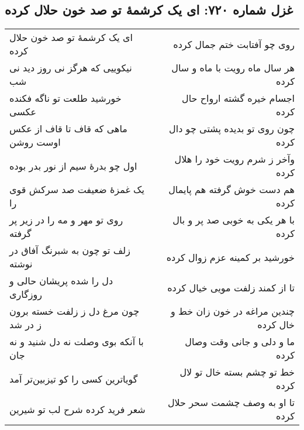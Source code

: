 \begin{center}
\section*{غزل شماره ۷۲۰: ای یک کرشمهٔ تو صد خون حلال کرده}
\label{sec:720}
\begin{longtable}{l p{0.5cm} r}
ای یک کرشمهٔ تو صد خون حلال کرده
&&
روی چو آفتابت ختم جمال کرده
\\
نیکوییی که هرگز نی روز دید نی شب
&&
هر سال ماه رویت با ماه و سال کرده
\\
خورشید طلعت تو ناگه فکنده عکسی
&&
اجسام خیره گشته ارواح حال کرده
\\
ماهی که قاف تا قاف از عکس اوست روشن
&&
چون روی تو بدیده پشتی چو دال کرده
\\
اول چو بدرهٔ سیم از نور بدر بوده
&&
وآخر ز شرم رویت خود را هلال کرده
\\
یک غمزهٔ ضعیفت صد سرکش قوی را
&&
هم دست خوش گرفته هم پایمال کرده
\\
روی تو مهر و مه را در زیر پر گرفته
&&
با هر یکی به خوبی صد پر و بال کرده
\\
زلف تو چون به شبرنگ آفاق در نوشته
&&
خورشید بر کمینه عزم زوال کرده
\\
دل را شده پریشان حالی و روزگاری
&&
تا از کمند زلفت مویی خیال کرده
\\
چون مرغ دل ز زلفت خسته برون ز در شد
&&
چندین مراغه در خون زان خط و خال کرده
\\
با آنکه بوی وصلت نه دل شنید و نه جان
&&
ما و دلی و جانی وقت وصال کرده
\\
گویاترین کسی را کو تیزبین‌تر آمد
&&
خط تو چشم بسته خال تو لال کرده
\\
شعر فرید کرده شرح لب تو شیرین
&&
تا او به وصف چشمت سحر حلال کرده
\\
\end{longtable}
\end{center}
